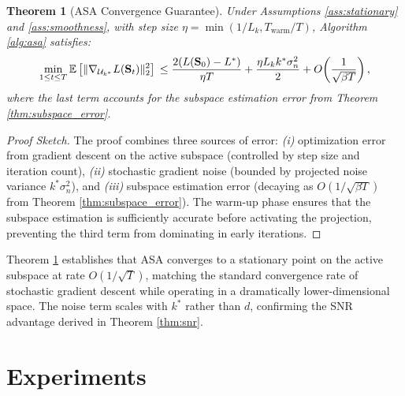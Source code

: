 ﻿\documentclass[lettersize,journal]{IEEEtran}
\newtheorem{theorem}{Theorem}
\begin{document}
\begin{theorem}[ASA Convergence Guarantee]
\label{thm:asa_convergence}
Under Assumptions \ref{ass:stationary} and \ref{ass:smoothness}, with step size $\eta = \min(1/L_k, T_{\text{warm}}/T)$, Algorithm \ref{alg:asa} satisfies:
\begin{equation}
\label{eq:asa_guarantee}
\min_{1 \leq t \leq T} \mathbb{E}\left[\|\nabla_{\mathcal{U}_{k^*}} L(\mathbf{S}_t)\|_2^2\right] \\\\
\leq \frac{2(L(\mathbf{S}_0) - L^*)}{\eta T} + \frac{\eta L_k k^* \sigma_n^2}{2} + O\!\left(\frac{1}{\sqrt{\beta T}}\right),
\end{equation}
where the last term accounts for the subspace estimation error from Theorem \ref{thm:subspace_error}.
\end{theorem}

\begin{proof}[Proof Sketch]
The proof combines three sources of error: \textit{(i)} optimization error from gradient descent on the active subspace (controlled by step size and iteration count), \textit{(ii)} stochastic gradient noise (bounded by projected noise variance $k^* \sigma_n^2$), and \textit{(iii)} subspace estimation error (decaying as $O(1/\sqrt{\beta T})$ from Theorem \ref{thm:subspace_error}). The warm-up phase ensures that the subspace estimation is sufficiently accurate before activating the projection, preventing the third term from dominating in early iterations.
\end{proof}

Theorem \ref{thm:asa_convergence} establishes that ASA converges to a stationary point on the active subspace at rate $O(1/\sqrt{T})$, matching the standard convergence rate of stochastic gradient descent while operating in a dramatically lower-dimensional space. The noise term scales with $k^*$ rather than $d$, confirming the SNR advantage derived in Theorem \ref{thm:snr}.



\section{Experiments}
\label{sec:experiments}
\end{document}
